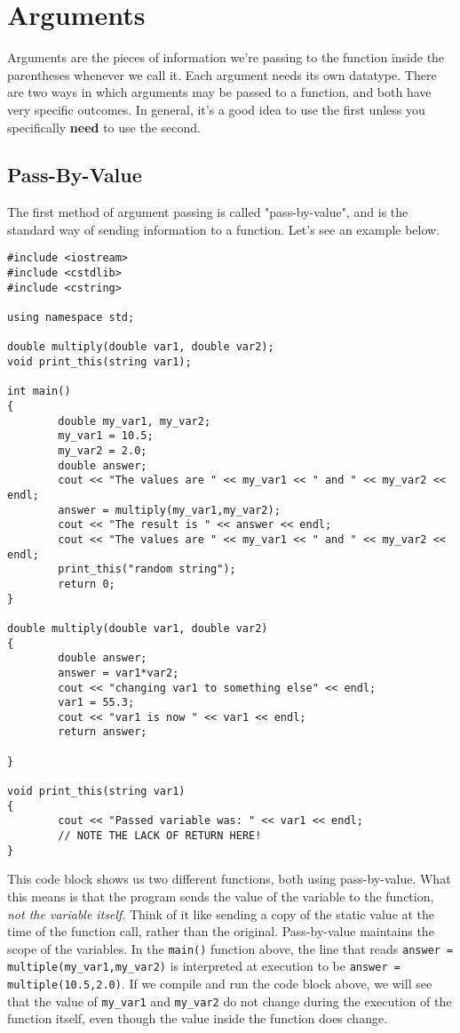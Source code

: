 \section{Arguments}
Arguments are the pieces of information we're passing to the function inside the parentheses whenever we call it.  Each argument needs its own datatype.  There are two ways in which arguments may be passed to a function, and both have very specific outcomes.  In general, it's a good idea to use the first unless you specifically \textbf{need} to use the second.

\subsection*{Pass-By-Value}
The first method of argument passing is called "pass-by-value", and is the standard way of sending information to a function.  Let's see an example below.

\begin{verbatim}
#include <iostream>
#include <cstdlib>
#include <cstring>

using namespace std;

double multiply(double var1, double var2);
void print_this(string var1);

int main()
{
        double my_var1, my_var2;
        my_var1 = 10.5;
        my_var2 = 2.0;
        double answer;
        cout << "The values are " << my_var1 << " and " << my_var2 << endl;
        answer = multiply(my_var1,my_var2);
        cout << "The result is " << answer << endl;
        cout << "The values are " << my_var1 << " and " << my_var2 << endl;
        print_this("random string");
        return 0;
}

double multiply(double var1, double var2)
{
        double answer;
        answer = var1*var2;
        cout << "changing var1 to something else" << endl;
        var1 = 55.3;
        cout << "var1 is now " << var1 << endl;
        return answer;

}

void print_this(string var1)
{
        cout << "Passed variable was: " << var1 << endl;
        // NOTE THE LACK OF RETURN HERE!
}
\end{verbatim}

This code block shows us two different functions, both using pass-by-value.  What this means is that the program sends the value of the variable to the function, \textit{not the variable itself}.  Think of it like sending a copy of the static value at the time of the function call, rather than the original.  Pass-by-value maintains the scope of the variables.  In the \texttt{main()} function above, the line that reads \texttt{answer = multiple(my\_var1,my\_var2)} is interpreted at execution to be \texttt{answer = multiple(10.5,2.0)}.  If we compile and run the code block above, we will see that the value of \texttt{my\_var1} and \texttt{my\_var2} do not change during the execution of the function itself, even though the value inside the function does change.
